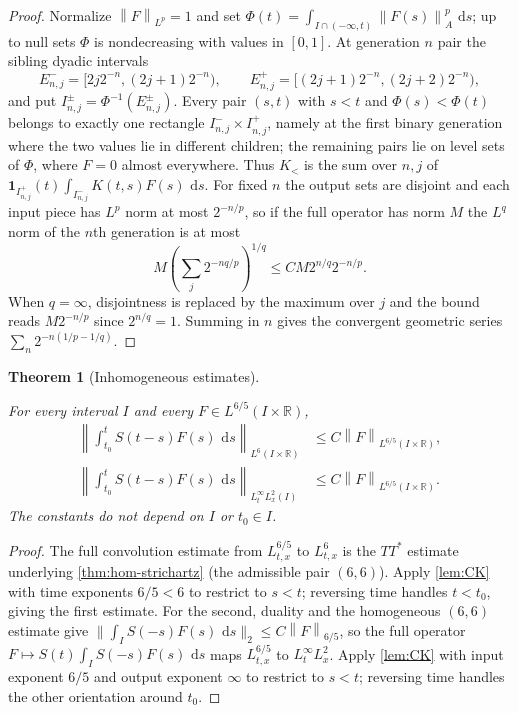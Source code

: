 \documentclass[11pt,oneside]{book}
\providecommand{\uses}[1]{}
\newtheorem{theorem}{Theorem}[chapter]
\theoremstyle{definition}
\theoremstyle{remark}
\newcommand{\R}{\mathbb R}
\newcommand{\1}{\mathbf 1}
\newcommand{\dd}{\,\mathrm d}
\newcommand{\norm}[1]{\left\lVert #1\right\rVert}
\begin{document}
\begin{proof}
Normalize $\norm F_{L^p}=1$ and set $\Phi(t)=\int_{I\cap(-\infty,t)}\norm{F(s)}_A^p\,\dd s$; up to null sets $\Phi$ is nondecreasing with values in $[0,1]$. At generation $n$ pair the sibling dyadic intervals
\[
 E^-_{n,j}=[2j2^{-n},(2j+1)2^{-n}),
 \qquad
 E^+_{n,j}=[(2j+1)2^{-n},(2j+2)2^{-n}),
\]
and put $I^\pm_{n,j}=\Phi^{-1}(E^\pm_{n,j})$. Every pair $(s,t)$ with $s<t$ and $\Phi(s)<\Phi(t)$ belongs to exactly one rectangle $I^-_{n,j}\times I^+_{n,j}$, namely at the first binary generation where the two values lie in different children; the remaining pairs lie on level sets of $\Phi$, where $F=0$ almost everywhere. Thus $K_<$ is the sum over $n,j$ of $\1_{I^+_{n,j}}(t)\int_{I^-_{n,j}}K(t,s)F(s)\,\dd s$. For fixed $n$ the output sets are disjoint and each input piece has $L^p$ norm at most $2^{-n/p}$, so if the full operator has norm $M$ the $L^q$ norm of the $n$th generation is at most
\[
 M\left(\sum_j 2^{-nq/p}\right)^{1/q}
 \le CM2^{n/q}2^{-n/p}.
\]
When $q=\infty$, disjointness is replaced by the maximum over $j$ and the bound reads $M2^{-n/p}$ since $2^{n/q}=1$. Summing in $n$ gives the convergent geometric series $\sum_n2^{-n(1/p-1/q)}$.
\end{proof}

\begin{theorem}[Inhomogeneous estimates]\label{thm:inhom-str}
\uses{def:propagator}
For every interval $I$ and every $F\in L^{6/5}(I\times\R)$,
\begin{align*}
 \left\|\int_{t_0}^tS(t-s)F(s)\,\dd s\right\|_{L^6(I\times\R)}
 &\le C\norm F_{L^{6/5}(I\times\R)},\\
 \left\|\int_{t_0}^tS(t-s)F(s)\,\dd s\right\|_{L^\infty_tL^2_x(I)}
 &\le C\norm F_{L^{6/5}(I\times\R)}.
\end{align*}
The constants do not depend on $I$ or $t_0\in I$.
\end{theorem}

\begin{proof}
\uses{thm:hom-strichartz, lem:CK}
The full convolution estimate from $L^{6/5}_{t,x}$ to $L^6_{t,x}$ is the $TT^*$ estimate underlying \cref{thm:hom-strichartz} (the admissible pair $(6,6)$). Apply \cref{lem:CK} with time exponents $6/5<6$ to restrict to $s<t$; reversing time handles $t<t_0$, giving the first estimate. For the second, duality and the homogeneous $(6,6)$ estimate give $\|\int_I S(-s)F(s)\,\dd s\|_2\le C\norm F_{6/5}$, so the full operator $F\mapsto S(t)\int_I S(-s)F(s)\,\dd s$ maps $L^{6/5}_{t,x}$ to $L^\infty_tL^2_x$. Apply \cref{lem:CK} with input exponent $6/5$ and output exponent $\infty$ to restrict to $s<t$; reversing time handles the other orientation around $t_0$.
\end{proof}
\end{document}
